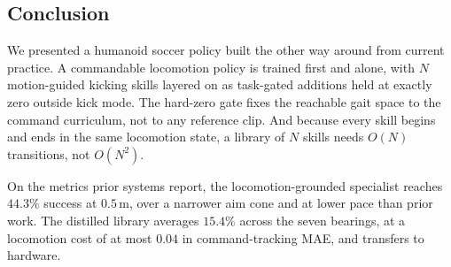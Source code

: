 \documentclass[letterpaper, 10 pt, conference]{ieeeconf}  %
\begin{document}
\subsection{Conclusion}

We presented a humanoid soccer policy built the other way around from current
practice. A commandable locomotion policy is trained first and alone, with $N$
motion-guided kicking skills layered on as task-gated additions held at
exactly zero outside kick mode. The hard-zero gate fixes the reachable gait
space to the command curriculum, not to any reference clip. And because every
skill begins and ends in the same locomotion state, a library of $N$ skills
needs $O(N)$ transitions, not $O(N^2)$.

On the metrics prior systems report, the locomotion-grounded specialist
reaches $44.3\%$ success at $0.5$\,m, over a narrower aim cone and at lower
pace than prior work. The distilled library averages $15.4\%$ across the seven
bearings, at a locomotion cost of at most $0.04$ in command-tracking MAE, and
transfers to hardware.

\FloatBarrier





\end{document}
